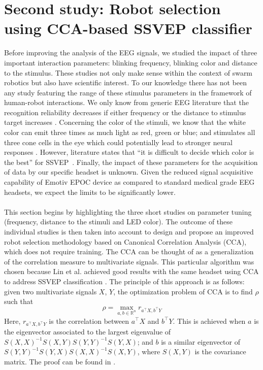 \documentclass[smallextended]{svjour3}
\begin{document}
\section{Second study: Robot selection using CCA-based SSVEP classifier}
\label{sec:CCA_approach}
Before improving the analysis of the EEG signals, we studied the impact of three important interaction parameters: blinking frequency, blinking color and distance to the stimulus. These studies not only make sense within the context of swarm robotics but also have scientific interest. To our knowledge there has not been any study featuring the range of these stimulus parameters in the framework of human-robot interactions. We only know from generic EEG literature that the recognition reliability decreases if either frequency or the distance to stimulus target increases \cite{herrmann2001,wu2013effect}. Concerning the color of the stimuli, we know that the white color can emit three times as much light as red, green or blue; and stimulates all three cone cells in the eye which could potentially lead to stronger neural responses \cite{aljshamee2016discriminate,cao2012flashing}. However, literature states that ``it is difficult to decide which color is the best'' for SSVEP~\cite{Zhu2010}.
Finally, the impact of these parameters for the acquisition of data by our specific headset is unknown. Given the reduced signal acquisitive capability of Emotiv EPOC device as compared to standard medical grade EEG headsets, we expect the limits to be significantly lower.\\
\\
This section begins by highlighting the three short studies on parameter tuning (frequency, distance to the stimuli and LED color). The outcome of these individual studies is then taken into account to design and propose an improved robot selection methodology based on Canonical Correlation Analysis (CCA), which does not require training. 
The CCA can be thought of as a generalization of the correlation measure to multivariate signals. 
This particular algorithm was chosen because Lin et al. achieved good results with the same headset using CCA to address SSVEP classification \cite{Lin2014}. The principle of this approach is as follows: given two multivariate signals $X$, $Y$, the optimization problem of CCA is to find $\rho$ such that
\\
\begin{equation}
\label{rho}
\rho = \max_{a, b \in \mathbb R^n} r_{ a^\top X, b^\top Y}
\end{equation}
Here, $r_{a^\top X, b^\top Y}$ is the correlation between $a^\top X$ and $b^\top Y$. This is achieved when $a$ is the eigenvector associated to the largest eigenvalue of $S(X, X)^{-1} S(X,Y) S(Y, Y)^{-1} S(Y, X)$; and $b$ is a similar eigenvector of $S(Y, Y)^{-1} S(Y, X) S(X, X)^{-1} S(X, Y)$, where $S(X, Y)$ is the covariance matrix. The proof can be found in \cite{rencher2003}.
\end{document}
